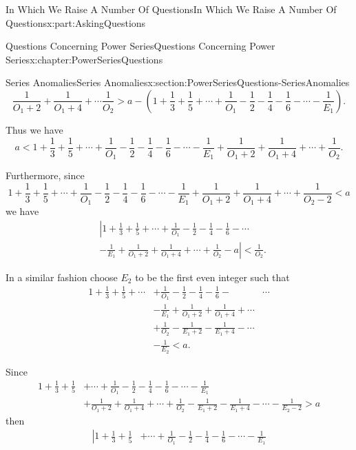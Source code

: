 \documentclass[oneside,10pt,]{book}
\numberwithin{equation}{section}
\newcommand{\lt}{<}
\newcommand{\amp}{&}
\begin{document}
\begin{partptx}{In Which We Raise A Number Of Questions}{}{In Which We Raise A Number Of Questions}{}{}{x:part:AskingQuestions}
\begin{chapterptx}{Questions Concerning Power Series}{}{Questions Concerning Power Series}{}{}{x:chapter:PowerSeriesQuestions}
\begin{sectionptx}{Series Anomalies}{}{Series Anomalies}{}{}{x:section:PowerSeriesQuestions-SeriesAnomalies}
\begin{equation*}
\frac{1}{O_1+2}+\frac{1}{O_1+4}+\cdots\frac{1}{O_2}>a-\left(1+\frac{1}{3}+ \frac{1}{5}+\cdots+\frac{1}{O_1}-\frac{1}{2}-\frac{1}{4}-\frac{1}{6}-\cdots- \frac{1}{E_1}\right)\text{.}
\end{equation*}
%
\par
Thus we have%
\begin{equation*}
a\lt 1+\frac{1}{3}+\frac{1}{5}+\cdots+\frac{1}{O_1}-\frac{1}{2}-\frac{1}{4}- \frac{1}{6}-\cdots-\frac{1}{E_1}+\frac{1}{O_1+2}+\frac{1}{O_1+4}+\cdots+ \frac{1}{O_2}\text{.}
\end{equation*}
%
\par
Furthermore, since%
\begin{equation*}
1+\frac{1}{3}+\frac{1}{5}+\cdots+\frac{1}{O_1}-\frac{1}{2}-\frac{1}{4}- \frac{1}{6}-\cdots-\frac{1}{E_1}+\frac{1}{O_1+2}+\frac{1}{O_1+4}+\cdots+ \frac{1}{O_2-2}\lt a
\end{equation*}
we have%
\begin{align*}
\amp \left|1+\frac{1}{3}+\frac{1}{5}+\cdots+\frac{1}{O_1}-\frac{1}{2}-\frac{1}{4}- \frac{1}{6}-\cdots\right.\\
\amp \left.-\frac{1}{E_1}+\frac{1}{O_1+2}+\frac{1}{O_1+4}+\cdots+ \frac{1}{O_2}-a\right|\lt \frac{1}{O_2}\text{.}
\end{align*}
%
\par
In a similar fashion choose \(E_2\) to be the first even integer such that%
\begin{align*}
1+\frac{1}{3}+\frac{1}{5}+\cdots\amp +\frac{1}{O_1}-\frac{1}{2}- \frac{1}{4}-\frac{1}{6}-\amp \cdots\\
\amp -\frac{1}{E_1}+ \frac{1}{O_1+2}+\frac{1}{O_1+4}+\cdots\\
\amp +\frac{1}{O_2}-\frac{1}{E_1+2}-\frac{1}{E_1+4}-\cdots\\
\amp -\frac{1}{E_2}\lt a\text{.}
\end{align*}
%
\par
Since%
\begin{align*}
1+\frac{1}{3}+\frac{1}{5}\amp +\cdots+\frac{1}{O_1}-\frac{1}{2}- \frac{1}{4}-\frac{1}{6}-\cdots-\frac{1}{E_1}\\
\amp +\frac{1}{O_1+2}+\frac{1}{O_1+4}+\cdots+\frac{1}{O_2}- \frac{1}{E_1+2}-\frac{1}{E_1+4}-\cdots-\frac{1}{E_2-2}>a
\end{align*}
then%
\begin{align*}
\left|1+\frac{1}{3}\right.+\frac{1}{5}\amp +\cdots+\frac{1}{O_1}-\frac{1}{2}- \frac{1}{4}-\frac{1}{6}-\cdots-\frac{1}{E_1}\\

\end{align*}
\end{sectionptx}
\end{chapterptx}
\end{partptx}
\end{document}
